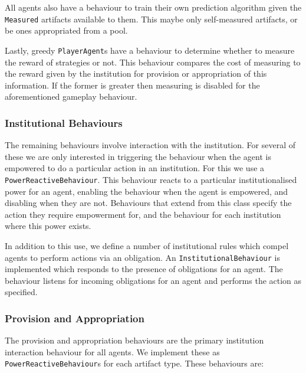 All agents also have a behaviour to train their own prediction algorithm given the
\texttt{Measured} artifacts available to them. This maybe only self-measured
artifacts, or be ones appropriated from a pool.

Lastly, greedy \texttt{PlayerAgent}s have a behaviour to determine
whether to measure the reward of strategies or not. This behaviour compares the
cost of measuring to the reward given by the institution for provision or
appropriation of this information. If the former is greater then measuring is
disabled for the aforementioned gameplay behaviour.

\subsubsection*{Institutional Behaviours}

The remaining behaviours involve interaction with the institution.
For several of these we are only interested in triggering the behaviour when
the agent is empowered to do a particular action in an institution. For this
we use a \texttt{PowerReactiveBehaviour}. This behaviour reacts to a
particular institutionalised power for an agent, enabling the behaviour when
the agent is empowered, and disabling when they are not. Behaviours that extend
from this class specify the action they require empowerment for, and the
behaviour for each institution where this power exists.

In addition to this use, we define a number of institutional rules which
compel agents to perform actions via an obligation. An
\texttt{InstitutionalBehaviour} is implemented which responds to the presence of obligations
for an agent. The behaviour listens for incoming obligations for an agent and
performs the action as specified. 

\subsubsection*{Provision and Appropriation}

The provision and appropriation behaviours are the primary institution
interaction behaviour for all agents. We implement these as
\texttt{PowerReactiveBehaviour}s for each artifact type. These behaviours are:

